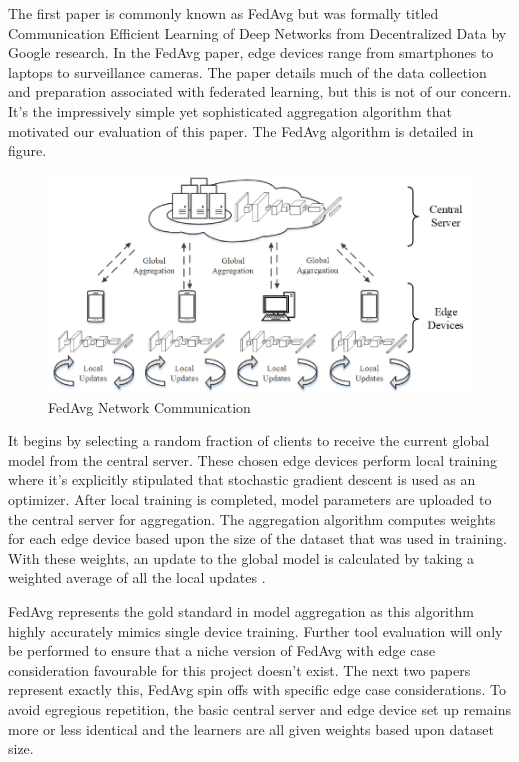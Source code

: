 \documentclass[../mthe-493-final-project.tex]{subfiles}
\begin{document}
    The first paper is commonly known as FedAvg but was formally titled Communication Efficient Learning of Deep Networks from Decentralized Data by Google research. In the FedAvg paper, edge devices range from smartphones to laptops to surveillance cameras. The paper details much of the data collection and preparation associated with federated learning, but this is not of our concern. It’s the impressively simple yet sophisticated aggregation algorithm that motivated our evaluation of this paper. The FedAvg algorithm is detailed in figure.
    \begin{figure}
        \centering
        \includegraphics[width=115mm,scale=0.35]{thesis/img/tool_eval_1.png}
        \caption{FedAvg Network Communication}
        \label{fig:FedAvg}
    \end{figure}

    It begins by selecting a random fraction of clients to receive the current global model from the central server. These chosen edge devices perform local training where it’s explicitly stipulated that stochastic gradient descent is used as an optimizer. After local training is completed, model parameters are uploaded to the central server for aggregation. The aggregation algorithm computes weights for each edge device based upon the size of the dataset that was used in training. With these weights, an update to the global model is calculated by taking a weighted average of all the local updates \cite{FedAvg}.

    FedAvg represents the gold standard in model aggregation as this algorithm highly accurately mimics single device training. Further tool evaluation will only be performed to ensure that a niche version of FedAvg with edge case consideration favourable for this project doesn’t exist.
    The next two papers represent exactly this, FedAvg spin offs with specific edge case considerations. To avoid egregious repetition, the basic central server and edge device set up remains more or less identical and the learners are all given weights based upon dataset size. 
    
\end{document}
